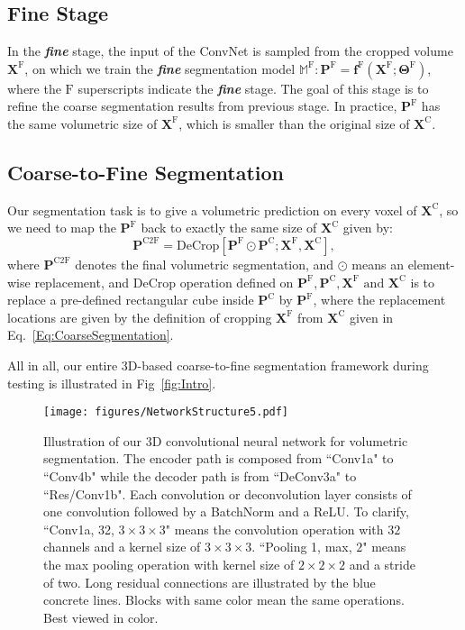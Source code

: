 \documentclass[10pt,twocolumn,letterpaper]{article}
\begin{document}
\subsection{Fine Stage}\label{Sec:FineStage}
In the \textit{\textbf{fine}} stage, the input of the ConvNet is sampled from the cropped volume $\mathbf{X}^\textrm{F}$, on which we train the \textit{\textbf{fine}} segmentation model $\mathbb{M}^\textrm{F}: \mathbf{P}^\textrm{F} = {\mathbf{f}^\textrm{F}\!\left(\mathbf{X}^\textrm{F}; \boldsymbol{\Theta}^\textrm{F}\right)}$, where the $\textrm{F}$ superscripts indicate the \textit{\textbf{fine}} stage. The goal of this stage is to refine the coarse segmentation results from previous stage. In practice, $\mathbf{P}^\textrm{F}$ has the same volumetric size of $\mathbf{X}^\textrm{F}$, which is smaller than the original size of $\mathbf{X}^\textrm{C}$. 

\subsection{Coarse-to-Fine Segmentation}\label{Sec:Coarse2Fine}
Our segmentation task is to give a volumetric prediction on every voxel of $\mathbf{X}^\textrm{C}$, so we need to map the $\mathbf{P}^\textrm{F}$ back to exactly the same size of $\mathbf{X}^\textrm{C}$ given by:
\begin{equation}\label{Eq:C2FSegmentation}
\mathbf{P}^\textrm{C2F} = \textrm{DeCrop}[\mathbf{P}^\textrm{F}\odot\mathbf{P}^\textrm{C}; \mathbf{X}^\textrm{F}, \mathbf{X}^\textrm{C}],
\end{equation}
where $\mathbf{P}^\textrm{C2F}$ denotes the final volumetric segmentation, and $\odot$ means an element-wise replacement, and $\textrm{DeCrop}$ operation defined on $\mathbf{P}^\textrm{F}, \mathbf{P}^\textrm{C}, \mathbf{X}^\textrm{F} \textrm{ and } \mathbf{X}^\textrm{C}$ is to replace a pre-defined rectangular cube inside $\mathbf{P}^\textrm{C}$ by $\mathbf{P}^\textrm{F}$, where the replacement locations are given by the definition of cropping $\mathbf{X}^\textrm{F}$ from $\mathbf{X}^\textrm{C}$ given in Eq.~\ref{Eq:CoarseSegmentation}.

All in all, our entire 3D-based coarse-to-fine segmentation framework during testing is illustrated in Fig~\ref{fig:Intro}. 

\begin{figure*}
  \centering
  \texttt{[image: figures/NetworkStructure5.pdf]}\\
  \caption{Illustration of our 3D convolutional neural network for volumetric segmentation. The encoder path is composed from ``Conv1a" to ``Conv4b" while the decoder path is from ``DeConv3a" to ``Res/Conv1b". Each convolution or deconvolution layer consists of one convolution followed by a BatchNorm and a ReLU. To clarify, ``Conv1a, 32, $3\times 3 \times 3$" means the convolution operation with $32$ channels and a kernel size of $3\times 3 \times 3$. ``Pooling 1, max, $2$" means the max pooling operation with kernel size of $2\times 2 \times 2$ and a stride of two. Long residual connections are illustrated by the blue concrete lines. Blocks with same color mean the same operations. Best viewed in color.}\label{fig:ResDSN}
\end{figure*}
\end{document}
